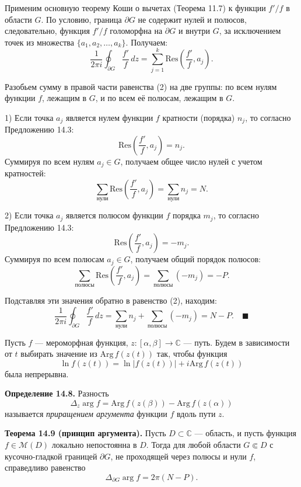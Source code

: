 \documentclass[12pt, a4paper]{article}
\theoremstyle{definition}
\theoremstyle{remark}
\begin{document}
Применим основную теорему Коши о вычетах (Теорема 11.7) к функции $f'/f$ в области $G$. По условию, граница $\partial G$ не содержит нулей и полюсов, следовательно, функция $f'/f$ голоморфна на $\partial G$ и внутри $G$, за исключением точек из множества $\{a_1, a_2, \ldots, a_k\}$. Получаем:
\begin{equation}
	\frac{1}{2\pi i} \oint_{\partial G} \frac{f'}{f} \, dz = \sum_{j=1}^{k} \text{Res}\left(\frac{f'}{f}, a_j\right).
\end{equation}

Разобьем сумму в правой части равенства (2) на две группы: по всем нулям функции $f$, лежащим в $G$, и по всем её полюсам, лежащим в $G$.

1) Если точка $a_j$ является нулем функции $f$ кратности (порядка) $n_j$, то согласно Предложению 14.3:
$$ \text{Res}\left(\frac{f'}{f}, a_j\right) = n_j. $$
Суммируя по всем нулям $a_j \in G$, получаем общее число нулей с учетом кратностей:
$$ \sum_{\text{нули}} \text{Res}\left(\frac{f'}{f}, a_j\right) = \sum_{\text{нули}} n_j = N. $$

2) Если точка $a_j$ является полюсом функции $f$ порядка $m_j$, то согласно Предложению 14.3:
$$ \text{Res}\left(\frac{f'}{f}, a_j\right) = -m_j. $$
Суммируя по всем полюсам $a_j \in G$, получаем общий порядок полюсов:
$$ \sum_{\text{полюсы}} \text{Res}\left(\frac{f'}{f}, a_j\right) = \sum_{\text{полюсы}} (-m_j) = -P. $$

Подставляя эти значения обратно в равенство (2), находим:
$$ \frac{1}{2\pi i} \oint_{\partial G} \frac{f'}{f} \, dz = \sum_{\text{нули}} n_j + \sum_{\text{полюсы}} (-m_j) = N - P. \quad \blacksquare $$

Пусть $f$ --- мероморфная функция, $z : [\alpha, \beta] \to \mathbb{C}$ --- путь. Будем в зависимости от $t$ выбирать значение из $\text{Arg} \, f(z(t))$ так, чтобы функция
$$\ln f(z(t)) = \ln |f(z(t))| + i \text{Arg} \, f(z(t))$$
была непрерывна.

\textbf{Определение 14.8.} Разность
$$\Delta_z \arg f = \text{Arg} \, f(z(\beta)) - \text{Arg} \, f(z(\alpha))$$
называется \textit{приращением аргумента} функции $f$ вдоль пути $z$.

\textbf{Теорема 14.9 (принцип аргумента).} Пусть $D \subset \mathbb{C}$ --- область, и пусть функция $f \in \mathcal{M}(D)$ локально непостоянна в $D$. Тогда для любой области $G \Subset D$ с кусочно-гладкой границей $\partial G$, не проходящей через полюсы и нули $f$, справедливо равенство
$$\Delta_{\partial G} \arg f = 2\pi (N - P).$$
\end{document}
